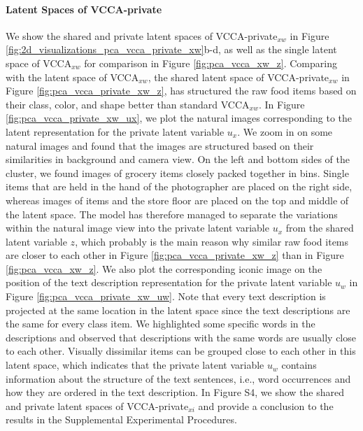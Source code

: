 

\vspace{-3mm}
\paragraph{Latent Spaces of VCCA-private } We show the shared and private latent spaces of VCCA-private$_{x w}$ in Figure \ref{fig:2d_visualizations_pca_vcca_private_xw}b-d, as well as the single latent space of VCCA$_{x w}$ for comparison in Figure \ref{fig:pca_vcca_xw_z}. 
Comparing with the latent space of VCCA$_{x w}$, the shared latent space of VCCA-private$_{x w}$ in Figure \ref{fig:pca_vcca_private_xw_z}, has structured the raw food items based on their class, color, and shape better than standard VCCA$_{x w}$. In Figure \ref{fig:pca_vcca_private_xw_ux}, we plot the natural images corresponding to the latent representation for the private latent variable $u_{x}$. We zoom in on some natural images and found that the images are structured based on their similarities in background and camera view. On the left and bottom sides of the cluster, we found images of grocery items closely packed together in bins. Single items that are held in the hand of the photographer are placed on the right side, whereas images of items and the store floor are placed on the top and middle of the latent space. The model has therefore managed to separate the variations within the natural image view into the private latent variable $u_{x}$ from the shared latent variable $z$, which probably is the main reason why similar raw food items are closer to each other in Figure \ref{fig:pca_vcca_private_xw_z} than in Figure \ref{fig:pca_vcca_xw_z}. We also plot the corresponding iconic image on the position of the text description representation for the private latent variable $u_{w}$ in Figure \ref{fig:pca_vcca_private_xw_uw}. Note that every text description is projected at the same location in the latent space since the text descriptions are the same for every class item. We highlighted some specific words in the descriptions and observed that descriptions with the same words are usually close to each other. Visually dissimilar items can be grouped close to each other in this latent space, which indicates that the private latent variable $u_{w}$ contains information about the structure of the text sentences, i.e., word occurrences and how they are ordered in the text description. 
In Figure S4, we show the shared and private latent spaces of VCCA-private$_{x i}$ and provide a conclusion to the results in the 
Supplemental Experimental Procedures.

